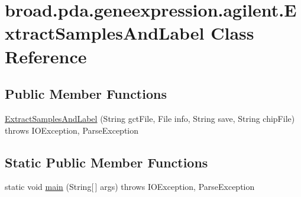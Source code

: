 \hypertarget{classbroad_1_1pda_1_1geneexpression_1_1agilent_1_1_extract_samples_and_label}{\section{broad.\+pda.\+geneexpression.\+agilent.\+Extract\+Samples\+And\+Label Class Reference}
\label{classbroad_1_1pda_1_1geneexpression_1_1agilent_1_1_extract_samples_and_label}
}
\subsection*{Public Member Functions}
\begin{DoxyCompactItemize}
\item 
\hyperlink{classbroad_1_1pda_1_1geneexpression_1_1agilent_1_1_extract_samples_and_label_af3e1eaf868b7ec54bddcae71ba5f9cc4}{Extract\+Samples\+And\+Label} (String gct\+File, File info, String save, String chip\+File)  throws I\+O\+Exception, Parse\+Exception
\end{DoxyCompactItemize}
\subsection*{Static Public Member Functions}
\begin{DoxyCompactItemize}
\item 
static void \hyperlink{classbroad_1_1pda_1_1geneexpression_1_1agilent_1_1_extract_samples_and_label_adfbddf9cd6c9ed062c8620f90b9a60f0}{main} (String\mbox{[}$\,$\mbox{]} args)  throws I\+O\+Exception, Parse\+Exception
\end{DoxyCompactItemize}


